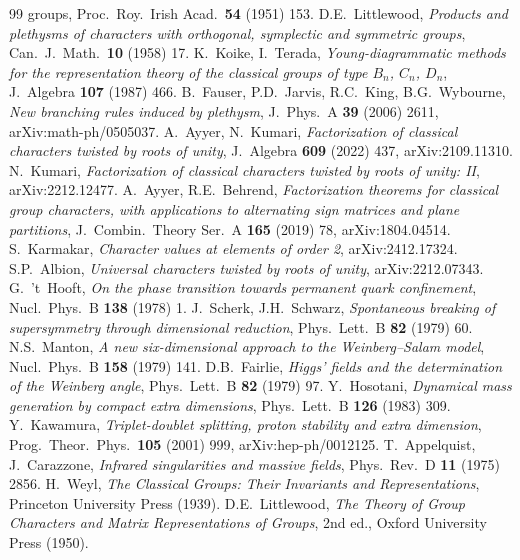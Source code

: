 \documentclass[11pt,a4paper]{article}
\begin{document}
\begin{thebibliography}{99}
{groups}, Proc.\ Roy.\ Irish Acad.\ \textbf{54} (1951) 153.
 D.E.~Littlewood, \emph{Products and plethysms of characters with
orthogonal, symplectic and symmetric groups}, Can.\ J.\ Math.\ \textbf{10} (1958) 17.
 K.~Koike, I.~Terada, \emph{Young-diagrammatic methods for the
representation theory of the classical groups of type $B_n$, $C_n$, $D_n$},
J.\ Algebra \textbf{107} (1987) 466.
 B.~Fauser, P.D.~Jarvis, R.C.~King, B.G.~Wybourne, \emph{New branching rules
induced by plethysm}, J.\ Phys.\ A \textbf{39} (2006) 2611, arXiv:math-ph/0505037.
 A.~Ayyer, N.~Kumari, \emph{Factorization of classical characters
twisted by roots of unity}, J.\ Algebra \textbf{609} (2022) 437, arXiv:2109.11310.
 N.~Kumari, \emph{Factorization of classical characters twisted by roots of
unity: II}, arXiv:2212.12477.
 A.~Ayyer, R.E.~Behrend, \emph{Factorization theorems for classical
group characters, with applications to alternating sign matrices and plane partitions},
J.\ Combin.\ Theory Ser.\ A \textbf{165} (2019) 78, arXiv:1804.04514.
 S.~Karmakar, \emph{Character values at elements of order 2},
arXiv:2412.17324.
 S.P.~Albion, \emph{Universal characters twisted by roots of unity},
arXiv:2212.07343.
 G.~'t~Hooft, \emph{On the phase transition towards permanent quark
confinement}, Nucl.\ Phys.\ B \textbf{138} (1978) 1.
 J.~Scherk, J.H.~Schwarz, \emph{Spontaneous breaking of supersymmetry
through dimensional reduction}, Phys.\ Lett.\ B \textbf{82} (1979) 60.
 N.S.~Manton, \emph{A new six-dimensional approach to the Weinberg--Salam
model}, Nucl.\ Phys.\ B \textbf{158} (1979) 141.
 D.B.~Fairlie, \emph{Higgs' fields and the determination of the Weinberg
angle}, Phys.\ Lett.\ B \textbf{82} (1979) 97.
 Y.~Hosotani, \emph{Dynamical mass generation by compact extra
dimensions}, Phys.\ Lett.\ B \textbf{126} (1983) 309.
 Y.~Kawamura, \emph{Triplet-doublet splitting, proton stability and
extra dimension}, Prog.\ Theor.\ Phys.\ \textbf{105} (2001) 999, arXiv:hep-ph/0012125.
 T.~Appelquist, J.~Carazzone, \emph{Infrared singularities and
massive fields}, Phys.\ Rev.\ D \textbf{11} (1975) 2856.
 H.~Weyl, \emph{The Classical Groups: Their Invariants and Representations},
Princeton University Press (1939).
 D.E.~Littlewood, \emph{The Theory of Group Characters and Matrix
Representations of Groups}, 2nd ed., Oxford University Press (1950).

\end{thebibliography}
\end{document}
